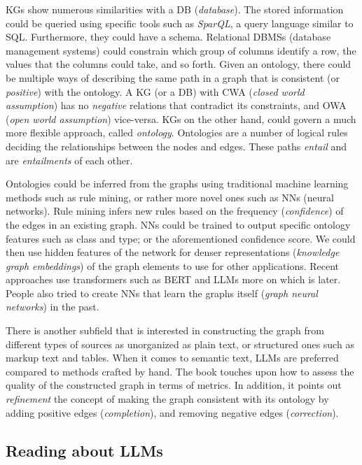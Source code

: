 \documentclass{article}
\begin{document}
KGs show numerous similarities with a DB (\textit{database}). The stored information could be queried using specific tools such as \textit{SparQL}, a query language similar to SQL. Furthermore, they could have a schema. Relational DBMSs (database management systems) could constrain which group of columns identify a row, the values that the columns could take, and so forth. Given an ontology, there could be multiple ways of describing the same path in a graph that is consistent (or \textit{positive}) with the ontology. A KG (or a DB) with CWA (\textit{closed world assumption}) has no \textit{negative} relations that contradict its constraints, and OWA (\textit{open world assumption}) vice-versa. KGs on the other hand, could govern a much more flexible approach, called \textit{ontology}. Ontologies are a number of logical rules deciding the relationships between the nodes and edges. These paths \textit{entail} and are \textit{entailments} of each other.

Ontologies could be inferred from the graphs using traditional machine learning methods such as rule mining, or rather more novel ones such as NNs (neural networks). Rule mining infers new rules based on the frequency (\textit{confidence}) of the edges in an existing graph. NNs could be trained to output specific ontology features such as class and type; or the aforementioned confidence score. We could then use hidden features of the network for denser representations (\textit{knowledge graph embeddings}) of the graph elements to use for other applications. Recent approaches use transformers such as BERT and LLMs more on which is later. People also tried to create NNs that learn the graphs itself (\textit{graph neural networks}) in the past.

There is another subfield that is interested in constructing the graph from different types of sources as unorganized as plain text, or structured ones such as markup text and tables. When it comes to semantic text, LLMs are preferred compared to methods crafted by hand. The book touches upon how to assess the quality of the constructed graph in terms of metrics. In addition, it points out \textit{refinement} the concept of making the graph consistent with its ontology by adding positive edges (\textit{completion}), and removing negative edges (\textit{correction})\cite{hogan_knowledge_2022}.

\subsection{Reading about LLMs}
\end{document}
